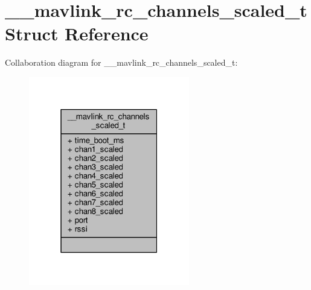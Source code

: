 \hypertarget{struct____mavlink__rc__channels__scaled__t}{\section{\+\_\+\+\_\+mavlink\+\_\+rc\+\_\+channels\+\_\+scaled\+\_\+t Struct Reference}
\label{struct____mavlink__rc__channels__scaled__t}
}


Collaboration diagram for \+\_\+\+\_\+mavlink\+\_\+rc\+\_\+channels\+\_\+scaled\+\_\+t\+:
\nopagebreak
\begin{figure}[H]
\begin{center}
\leavevmode
\includegraphics[width=199pt]{struct____mavlink__rc__channels__scaled__t__coll__graph}
\end{center}
\end{figure}
